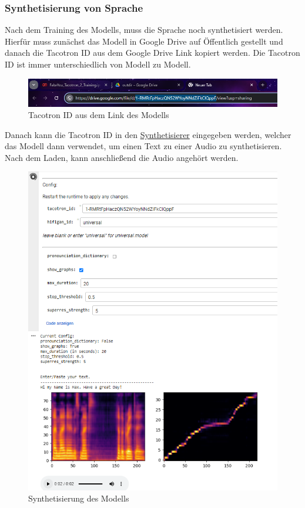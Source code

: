 \subsubsection*{Synthetisierung von Sprache}
Nach dem Training des Modells, muss die Sprache noch synthetisiert werden. Hierfür muss zunächst das Modell in Google Drive auf Öffentlich gestellt und danach die Tacotron ID aus dem Google Drive Link kopiert werden. Die Tacotron ID ist immer unterschiedlich von Modell zu Modell.
\begin{figure}[H]
    \includegraphics[width=1.0\textwidth]{Bilder/AudioTrainingLink}
    \centering
    \caption{Tacotron ID aus dem Link des Modells}
    \label{fig:TrainingLink}
\end{figure}
Danach kann die Tacotron ID in den \href{https://colab.research.google.com/github/justinjohn0306/FakeYou-Tacotron2-Notebook/blob/main/FakeYou_Tacotron2_Hi_Fi_GAN_(CPU).ipynb#scrollTo=nU8YYg6PXgjg}{Synthetisierer} eingegeben werden, welcher das Modell dann verwendet, um einen Text zu einer Audio zu synthetisieren. Nach dem Laden, kann anschließend die Audio angehört werden.
\begin{figure}[H]
    \includegraphics[width=1.0\textwidth]{Bilder/AudioTrainingSynth}
    \centering
    \caption{Synthetisierung des Modells}
    \label{fig:TrainingSynth}
\end{figure}